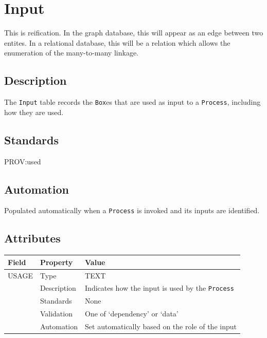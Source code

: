 \documentclass[
]{article}
\newcounter{none} %
\begin{document}
\section{Input}\label{input}

This is reification. In the graph database, this will appear as an edge
between two entites. In a relational database, this will be a relation
which allows the enumeration of the many-to-many linkage.

\subsection{Description}\label{description-15}

The \texttt{Input} table records the \texttt{Box}es that are used as
input to a \texttt{Process}, including how they are used.

\subsection{Standards}\label{standards-17}

PROV:used

\subsection{Automation}\label{automation-17}

Populated automatically when a \texttt{Process} is invoked and its
inputs are identified.

\subsection{Attributes}\label{attributes-15}

{\def\LTcaptype{none} %
\begin{longtable}[]{@{}lll@{}}
\toprule\noalign{}
Field & Property & Value \\
\midrule\noalign{}
\endhead
\bottomrule\noalign{}
\endlastfoot
USAGE & Type & TEXT \\
& Description & Indicates how the input is used by the
\texttt{Process} \\
& Standards & None \\
& Validation & One of `dependency' or `data' \\
& Automation & Set automatically based on the role of the input \\
\end{longtable}
}
\end{document}
